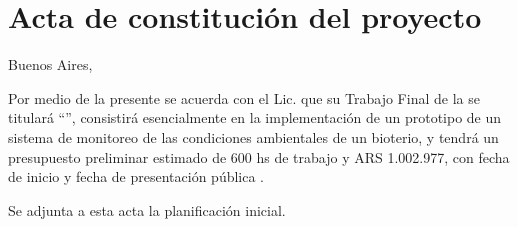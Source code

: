 \documentclass[
11pt, %
]{charter}
\begin{document}
\pagebreak



\section*{Acta de constitución del proyecto}
\label{sec:acta}

\begin{flushright}
Buenos Aires, \fechaInicioName
\end{flushright}

\vspace{2cm}


Por medio de la presente se acuerda con el Lic. \authorname\hspace{1px} que su Trabajo Final de la \degreename\hspace{1px} se titulará ``\ttitle'', consistirá esencialmente en {la implementación de un prototipo de un sistema de monitoreo de las condiciones ambientales de un bioterio}, y tendrá un presupuesto preliminar estimado de {600} hs de trabajo y {ARS 1.002.977}, con fecha de inicio \fechaInicioName\hspace{1px} y fecha de presentación pública \fechaFinalName.

Se adjunta a esta acta la planificación inicial.

\vfill
\end{document}
